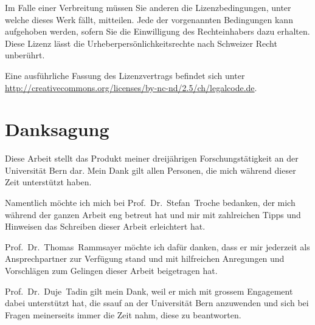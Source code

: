 \documentclass[11pt, twoside, a4paper]{book}		%
\begin{document}
\begin{titlepage}
	\RaggedRight Im Falle einer Verbreitung müssen Sie anderen die Lizenzbedingungen, unter welche dieses Werk fällt, mitteilen. Jede der vorgenannten Bedingungen kann aufgehoben werden, sofern Sie die Einwilligung des Rechteinhabers dazu erhalten. Diese Lizenz lässt die Urheberpersönlichkeitsrechte nach Schweizer Recht unberührt. 
	
	\hspace{1cm}
	
	Eine ausführliche Fassung des Lizenzvertrags befindet sich unter \url{http://creativecommons.org/licenses/by-nc-nd/2.5/ch/legalcode.de}.

\end{titlepage}
\restoregeometry

\setlength{\evensidemargin}{46pt}%
\setlength{\oddsidemargin}{46pt}%


\chapter*{\LARGE Danksagung}
\vspace{-.7cm}
Diese Arbeit stellt das Produkt meiner dreijährigen Forschungstätigkeit an der Universität Bern dar. Mein Dank gilt allen Personen, die mich während dieser Zeit unterstützt haben.

Namentlich möchte ich mich bei \mbox{Prof. Dr. Stefan Troche} bedanken, der mich während der ganzen Arbeit eng betreut hat und mir mit zahlreichen Tipps und Hinweisen das Schreiben dieser Arbeit erleichtert hat.

\mbox{Prof. Dr. Thomas Rammsayer} möchte ich dafür danken, dass er mir jederzeit als Ansprechpartner zur Verfügung stand und mit hilfreichen Anregungen und Vorschlägen zum Gelingen dieser Arbeit beigetragen hat.

\mbox{Prof. Dr. Duje Tadin} gilt mein Dank, weil er mich mit grossem Engagement dabei unterstützt hat, die \gls*{ssauf} an der Universität Bern anzuwenden und sich bei Fragen meinerseits immer die Zeit nahm, diese zu beantworten. 

\vspace{5 mm}
\end{document}

